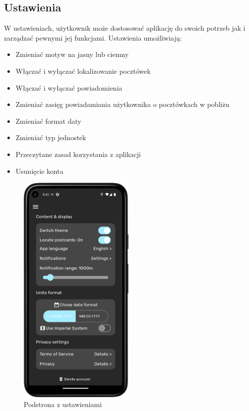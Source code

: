 \documentclass[a4paper,twoside,12pt]{book}
\begin{document}
\subsection{Ustawienia}
W ustawieniach, użytkownik może dostosować aplikację do swoich potrzeb jak i zarządzać pewnymi jej funkcjami. 
Ustawienia umożliwiają:
\begin{itemize}
    \item Zmieniać motyw na jasny lub ciemny
    \item Włączać i wyłączać lokalizowanie pocztówek
    \item Włączać i wyłączać powiadomienia
    \item Zmieniać zasięg powiadamiania użytkownika o pocztówkach w pobliżu
    \item Zmieniać format daty
    \item Zmieniać typ jednostek
    \item Przeczytane zasad korzystania z aplikacji
    \item Usunięcie konta
\end{itemize}

\begin{figure}[H]
    \centering
    \includegraphics[width=0.5\textwidth]{mobile_ss/ustawienia.png}
    \caption{Podstrona z ustawieniami}
\end{figure}
\end{document}
